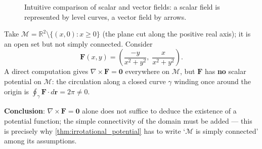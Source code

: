 \begin{figure}[htbp]
\centering
{}
\caption{Intuitive comparison of scalar and vector fields: a scalar field is represented by level curves, a vector field by arrows.}
\label{fig:scalar_vector_field}
\end{figure}

\begin{example}\label{ex:slit_domain_counterexample}
Take $\mathcal{M} = \mathbb{R}^2 \setminus \{(x,0) : x \ge 0\}$ (the plane cut along the positive real axis); it is an open set but not simply connected. Consider
\[
\mathbf{F}(x,y) = \left( \frac{-y}{x^2+y^2},\; \frac{x}{x^2+y^2} \right).
\]
A direct computation gives $\nabla \times \mathbf{F} = \mathbf{0}$ everywhere on $\mathcal{M}$, but $\mathbf{F}$ has \textbf{no} scalar potential on $\mathcal{M}$: the circulation along a closed curve $\gamma$ winding once around the origin is $\oint_\gamma \mathbf F \cdot d\mathbf r = 2\pi \neq 0$.

\textbf{Conclusion}: $\nabla\times\mathbf F=\mathbf 0$ alone does not suffice to deduce the existence of a potential function; the simple connectivity of the domain must be added --- this is precisely why \cref{thm:irrotational_potential} has to write `$\mathcal{M}$ is simply connected' among its assumptions.
\end{example}


